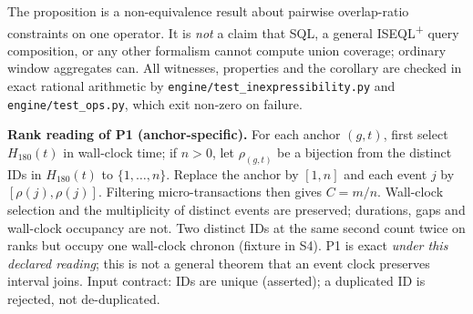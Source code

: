\documentclass[10pt]{article}
\newcommand{\iseql}{ISEQL\textsuperscript{+}}
\newcommand{\tf}[1]{\texttt{#1}}
\begin{document}
The proposition is a non-equivalence result about pairwise overlap-ratio constraints on one operator. It is \emph{not} a claim that SQL, a general \iseql{} query composition, or any other formalism cannot compute union coverage; ordinary window aggregates can. All witnesses, properties and the corollary are checked in exact rational arithmetic by \tf{engine/test\_inexpressibility.py} and \tf{engine/test\_ops.py}, which exit non-zero on failure.

\textbf{Rank reading of P1 (anchor-specific).} For each anchor $(g,t)$, first select $H_{180}(t)$ in wall-clock time; if $n>0$, let $\rho_{(g,t)}$ be a bijection from the distinct IDs in $H_{180}(t)$ to $\{1,\dots,n\}$. Replace the anchor by $[1,n]$ and each event $j$ by $[\rho(j),\rho(j)]$. Filtering micro-transactions then gives $C=m/n$. Wall-clock selection and the multiplicity of distinct events are preserved; durations, gaps and wall-clock occupancy are not. Two distinct IDs at the same second count twice on ranks but occupy one wall-clock chronon (fixture in S4). P1 is exact \emph{under this declared reading}; this is not a general theorem that an event clock preserves interval joins. Input contract: IDs are unique (asserted); a duplicated ID is rejected, not de-duplicated.
\end{document}
